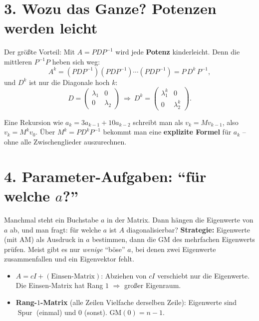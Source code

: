 \documentclass[a4paper,12pt]{article}
\newcommand{\EV}{Eigenvektor}
\begin{document}
\section*{3. Wozu das Ganze? Potenzen werden leicht}

Der gr\"o\ss te Vorteil: Mit $A = P D P^{-1}$ wird jede \textbf{Potenz} kinderleicht. Denn die mittleren $P^{-1}P$ heben sich weg:
\[
A^k = (PDP^{-1})(PDP^{-1})\cdots(PDP^{-1}) = P\,D^k\,P^{-1},
\]
und $D^k$ ist nur die Diagonale hoch $k$:
\[
D = \begin{pmatrix} \lambda_1 & 0 \\ 0 & \lambda_2 \end{pmatrix} \ \Rightarrow\
D^k = \begin{pmatrix} \lambda_1^k & 0 \\ 0 & \lambda_2^k \end{pmatrix}.
\]

\begin{merkbox}[title={Anwendung: Folgen}]
Eine Rekursion wie $a_k = 3a_{k-1} + 10a_{k-2}$ schreibt man als $v_k = M v_{k-1}$, also $v_k = M^k v_0$. \"Uber $M^k = P D^k P^{-1}$ bekommt man eine \textbf{explizite Formel} f\"ur $a_k$ -- ohne alle Zwischenglieder auszurechnen.
\end{merkbox}

\section*{4. Parameter-Aufgaben: ``f\"ur welche $a$?''}

Manchmal steht ein Buchstabe $a$ in der Matrix. Dann h\"angen die Eigenwerte von $a$ ab, und man fragt: f\"ur welche $a$ ist $A$ diagonalisierbar? \textbf{Strategie:} Eigenwerte (mit AM) als Ausdruck in $a$ bestimmen, dann die GM des mehrfachen Eigenwerts pr\"ufen. Meist gibt es nur \emph{wenige} ``b\"ose'' $a$, bei denen zwei Eigenwerte zusammenfallen und ein \EV{} fehlt.

\begin{merkbox}[title={Zwei n\"utzliche Strukturen (aus HW11)}]
\begin{itemize}[leftmargin=*, nosep]
    \item \textbf{$A = cI + (\text{Einsen-Matrix})$}: Abziehen von $cI$ verschiebt nur die Eigenwerte. Die Einsen-Matrix hat Rang $1$ $\Rightarrow$ gro\ss er Eigenraum.
    \item \textbf{Rang-$1$-Matrix} (alle Zeilen Vielfache derselben Zeile): Eigenwerte sind $\operatorname{Spur}$ (einmal) und $0$ (sonst). GM$(0) = n - 1$.
\end{itemize}
\end{merkbox}
\end{document}
